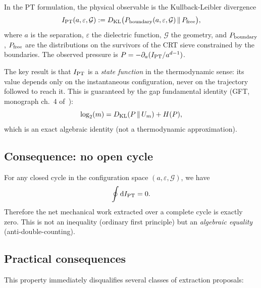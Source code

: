 \documentclass[11pt,a4paper]{article}
\newcommand{\IPT}{I_{\rm PT}}
\begin{document}
In the PT formulation, the physical observable is the Kullback-Leibler divergence
\begin{equation}
\IPT(a, \varepsilon, \mathcal{G}) := D_{\rm KL}\bigl(P_{\rm boundary}(a,\varepsilon,\mathcal{G})\,\|\,P_{\rm free}\bigr),
\label{eq:I-PT}
\end{equation}
where $a$ is the separation, $\varepsilon$ the dielectric function, $\mathcal{G}$ the geometry,
and $P_{\rm boundary}$, $P_{\rm free}$ are the distributions on the survivors of the CRT sieve
constrained by the boundaries. The observed pressure is $P = -\partial_{a}(\IPT/a^{d-1})$.

The key result is that $\IPT$ is a \emph{state function} in the thermodynamic sense: its value
depends only on the instantaneous configuration, never on the trajectory followed to reach it.
This is guaranteed by the gap fundamental identity (GFT, monograph ch.~4
of~\cite{Senez2026}):
\begin{equation}
\log_{2}(m) = D_{\rm KL}(P\,\|\,U_{m}) + H(P),
\label{eq:gft}
\end{equation}
which is an exact algebraic identity (not a thermodynamic approximation).

\subsection{Consequence: no open cycle}

For any closed cycle in the configuration space $(a, \varepsilon, \mathcal{G})$, we have
\begin{equation}
\oint \mathrm{d}\IPT = 0.
\label{eq:closed-cycle}
\end{equation}
Therefore the net mechanical work extracted over a complete cycle is exactly zero. This is not
an inequality (ordinary first principle) but an \emph{algebraic equality}
(anti-double-counting).

\subsection{Practical consequences}

This property immediately disqualifies several classes of extraction proposals:
\end{document}
